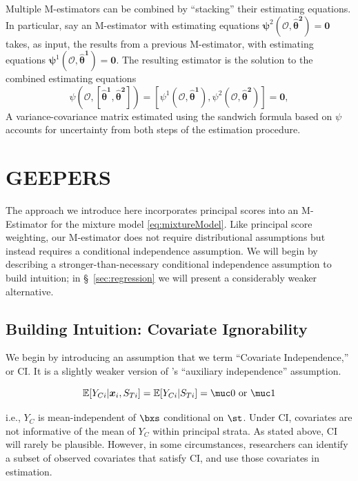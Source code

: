\documentclass[]{article}
\begin{document}
Multiple M-estimators can be combined by ``stacking'' their estimating equations.
In particular, say an M-estimator with estimating equations $\bm{\psi}^2(\bm{\mathcal{O}},\bm{\hat\theta^2})=\bm{0}$ takes, as input, the results from a previous M-estimator, with estimating equations $\bm{\psi}^1(\bm{\mathcal{O}},\bm{\hat\theta^1})=\bm{0}$.
The resulting estimator is the solution to the combined estimating equations
\begin{equation}\label{eq:stacked}
  \psi(\bm{\mathcal{O}},[\bm{\hat\theta^1},\bm{\hat{\theta}^2}])=[\psi^1(\bm{\mathcal{O}},\bm{\hat\theta^1}),\psi^2(\bm{\mathcal{O}},\bm{\hat\theta^2})]=\bm{0},
\end{equation}
A variance-covariance matrix estimated using the sandwich formula based on $\psi$ accounts for uncertainty from both steps of the estimation procedure. 



\section{GEEPERS }\label{sec:geepers}

The approach we introduce here incorporates principal scores into an M-Estimator for the mixture model \eqref{eq:mixtureModel}.
Like principal score weighting, our M-estimator does not require distributional assumptions but instead requires a conditional independence assumption.
We will begin by describing a stronger-than-necessary conditional independence assumption to build intuition; in \S~\ref{sec:regression} we will present a considerably weaker alternative.

\subsection{Building Intuition: Covariate Ignorability}\label{sec:ci}

We begin by introducing an assumption that we term ``Covariate Independence,'' or CI. It is a slightly weaker version of \citet{jiangDing2021}'s ``auxiliary independence'' assumption.
\begin{ass}\label{ass:ci}
\begin{equation}\label{eq:assumption}
\EE[\yci|\bxsi,\sti]=\EE[\yci|\sti]=\muc0\text{ or }\muc1
\end{equation}
\end{ass}
i.e., $Y_C$ is mean-independent of $\bxs$ conditional on $\st$.
Under CI, covariates are not informative of the mean of $Y_C$ within principal strata.
As stated above, CI will rarely be plausible.
However, in some circumstances, researchers can identify a subset of observed covariates that satisfy CI, and use those covariates in estimation.
\end{document}
